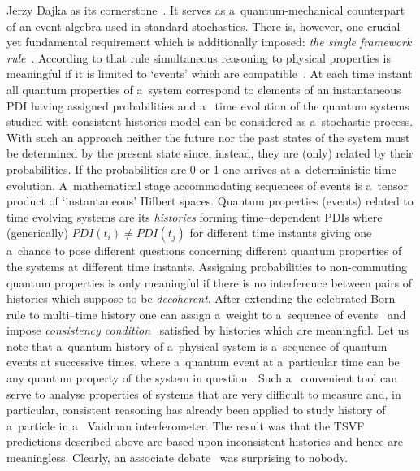 \begin{artengenv}{Jerzy Dajka}
as its cornerstone~\parencite{Griffiths}. It   serves as a~quantum-mechanical counterpart of an event algebra used in standard stochastics. There is, however, one  crucial yet fundamental requirement which is additionally imposed: {\it the single framework rule}~\parencite{Griffiths,Griffiths_reason,GRIFFITHS_measur}. According to that rule  simultaneous reasoning to physical properties is meaningful if it is limited to  `events'  which are compatible~\parencite{Griffiths,Griffiths_reason,GRIFFITHS_measur,GRIFFITHS_onto}. 
At each time instant all  quantum properties of a~system correspond to elements of an instantaneous PDI having assigned probabilities and a~ time  evolution  of the quantum systems studied with consistent histories model can be considered as a~stochastic process. With such an approach neither 
the future nor the past states of the system must be 
determined by the present state since,  instead, they are (only) related by their probabilities. If the probabilities are 0 or 1 one arrives at a~deterministic time evolution. A~mathematical stage accommodating  sequences of events is a~tensor product of `instantaneous' Hilbert spaces. 
%
Quantum properties (events) related to time evolving systems are its {\it histories} forming time--dependent PDIs 
where (generically) $PDI(t_i)\neq PDI(t_j)$ for different time instants giving one a~chance to pose different questions concerning different quantum properties of the systems at different time instants. 
Assigning probabilities to non-commuting quantum properties  is only meaningful if there is
no interference between pairs of histories which suppose to be {\it decoherent}. 
After extending the celebrated Born rule to multi--time history  one can assign a~weight to a~sequence of events~\parencite{Griffiths1984,Griffiths,Griffiths_reason,GRIFFITHS_onto, GRIFFITHS_measur} and impose  {\it consistency condition}~\parencite{Griffiths1984,Griffiths,Griffiths_reason,GRIFFITHS_onto, GRIFFITHS_measur} satisfied by histories which are meaningful.
Let us note that a~quantum history of a~physical system is a~sequence of quantum events at successive times, where a~quantum event at a~particular time can be any quantum property of the system in question \parencite{Griffiths}. Such a~ convenient tool can  serve to analyse properties of systems that are very difficult to measure and, in particular, consistent reasoning has already been applied to study history of a~particle in a~ Vaidman interferometer. The result was that the TSVF predictions described above are based upon inconsistent histories and hence are meaningless.  Clearly, an associate debate~\parencite{PhysRevA.94.032115,PhysRevA.95.066101} was surprising to nobody.

\end{artengenv}
